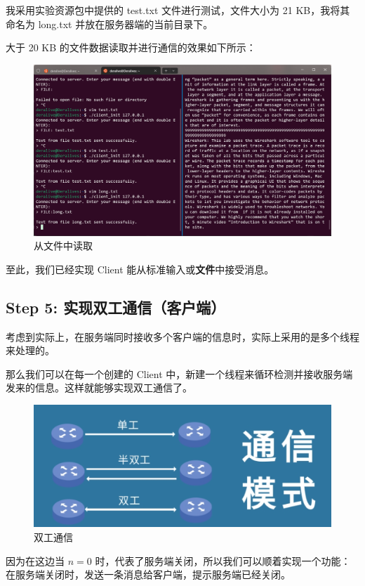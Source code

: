 \documentclass[14pt,a4paper,UTF8,twoside]{article}
\begin{document}
我采用实验资源包中提供的 test.txt 文件进行测试，文件大小为 21 KB，我将其命名为 long.txt 并放在服务器端的当前目录下。

大于 20 KB 的文件数据读取并进行通信的效果如下所示：

\begin{figure}[H]
    \centering
    \includegraphics[width=0.75\linewidth]{lab7/longtext.png}
    \caption{从文件中读取}
    \label{fig:long}
\end{figure}

\begin{rmr}
至此，我们已经实现 Client 能从标准输入或\textbf{文件}中接受消息。
\end{rmr}
\subsection{Step 5: 实现双工通信（客户端）}

考虑到实际上，在服务端同时接收多个客户端的信息时，实际上采用的是多个线程来处理的。

那么我们可以在每一个创建的 Client 中，新建一个线程来循环检测并接收服务端发来的信息。这样就能够实现双工通信了。

\begin{figure}[H]
    \centering
    \includegraphics[width=0.35\linewidth]{lab7/double.png}
    \caption{双工通信}
    \label{fig:fullduplex}
\end{figure}

因为在这边当 $n = 0$ 时，代表了服务端关闭，所以我们可以顺着实现一个功能：在服务端关闭时，发送一条消息给客户端，提示服务端已经关闭。
\end{document}
